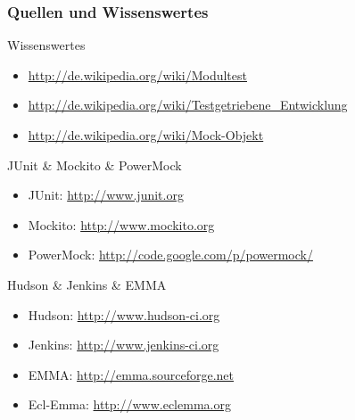 \documentclass{beamer}
\begin{document}
			\begin{frame}
				\frametitle{Quellen und Wissenswertes}

				\scriptsize
				Wissenswertes
				\begin{itemize}
					\item{\url{http://de.wikipedia.org/wiki/Modultest}}
					\item{\url{http://de.wikipedia.org/wiki/Testgetriebene\_Entwicklung}}
					\item{\url{http://de.wikipedia.org/wiki/Mock-Objekt}}
				\end{itemize}

				JUnit \& Mockito \& PowerMock
				\begin{itemize}
					\item{JUnit: \url{http://www.junit.org}}
					\item{Mockito: \url{http://www.mockito.org}}
					\item{PowerMock: \url{http://code.google.com/p/powermock/}}
				\end{itemize}

				Hudson \& Jenkins \& EMMA
				\begin{itemize}
					\item{Hudson: \url{http://www.hudson-ci.org}}
					\item{Jenkins: \url{http://www.jenkins-ci.org}}
					\item{EMMA: \url{http://emma.sourceforge.net}}
					\item{Ecl-Emma: \url{http://www.eclemma.org}}
				\end{itemize}
			\end{frame}
\end{document}

